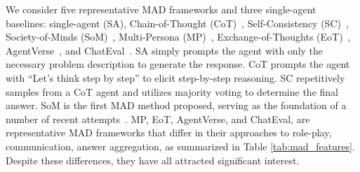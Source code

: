 \begin{table*}[tbp]
\caption{High-level comparison of MAD frameworks.}
\label{tab:mad_features}
\end{table*}

 We consider five representative %
 MAD frameworks and three single-agent baselines: 
 single-agent (SA), 
Chain-of-Thought (CoT)~\citep{cot}, Self-Consistency (SC)~\citep{wang2022self}, Society-of-Minds (SoM)~\citep{duimproving}, Multi-Persona (MP)~\citep{liang2023encouraging}, Exchange-of-Thoughts (EoT)~\citep{yin2023exchange}, AgentVerse~\citep{chen2023agentverse}, and ChatEval~\citep{chanchateval}.  
SA simply prompts the agent with only the necessary problem description to generate the response.
CoT prompts the agent with ``Let's think step by step'' to elicit step-by-step reasoning.
SC repetitively samples from a CoT agent and utilizes majority voting to determine the final answer.
SoM is the first MAD method proposed, serving as the foundation of a number of recent attempts~\citep{liang2023encouraging, chen2024IoA, xiong-FORD, qian2024scaling}. 
MP, EoT, AgentVerse, and ChatEval, are representative MAD frameworks that differ in their approaches to role-play, communication, answer aggregation, as summarized in Table \ref{tab:mad_features}.
Despite these differences, they have all attracted significant interest.  

